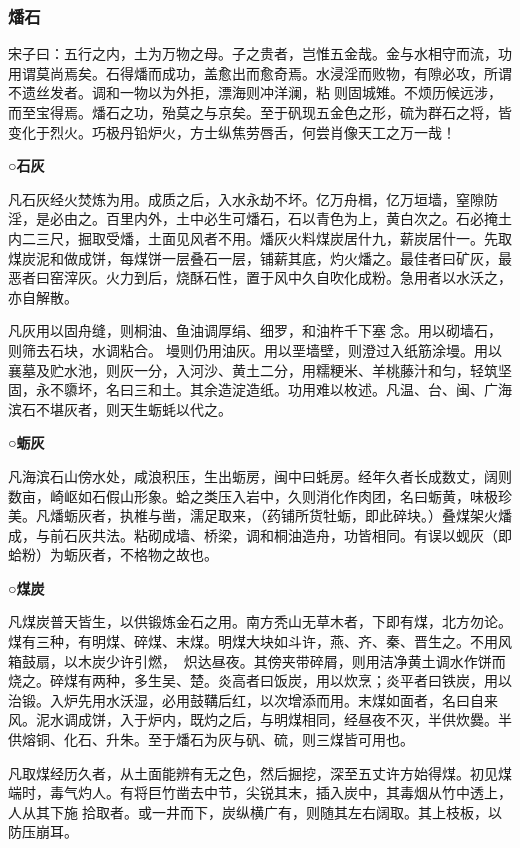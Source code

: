 \documentclass[]{article}
\begin{document}
\hypertarget{header-n2584}{%
\subsubsection{燔石}\label{header-n2584}}

宋子曰：五行之内，土为万物之母。子之贵者，岂惟五金哉。金与水相守而流，功用谓莫尚焉矣。石得燔而成功，盖愈出而愈奇焉。水浸淫而败物，有隙必攻，所谓不遗丝发者。调和一物以为外拒，漂海则冲洋澜，粘则固城雉。不烦历候远涉，而至宝得焉。燔石之功，殆莫之与京矣。至于矾现五金色之形，硫为群石之将，皆变化于烈火。巧极丹铅炉火，方士纵焦劳唇舌，何尝肖像天工之万一哉！

\textbf{○石灰}

凡石灰经火焚炼为用。成质之后，入水永劫不坏。亿万舟楫，亿万垣墙，窒隙防淫，是必由之。百里内外，土中必生可燔石，石以青色为上，黄白次之。石必掩土内二三尺，掘取受燔，土面见风者不用。燔灰火料煤炭居什九，薪炭居什一。先取煤炭泥和做成饼，每煤饼一层叠石一层，铺薪其底，灼火燔之。最佳者曰矿灰，最恶者曰窑滓灰。火力到后，烧酥石性，置于风中久自吹化成粉。急用者以水沃之，亦自解散。

凡灰用以固舟缝，则桐油、鱼油调厚绢、细罗，和油杵千下塞念。用以砌墙石，则筛去石块，水调粘合。墁则仍用油灰。用以垩墙壁，则澄过入纸筋涂墁。用以襄墓及贮水池，则灰一分，入河沙、黄土二分，用糯粳米、羊桃藤汁和匀，轻筑坚固，永不隳坏，名曰三和土。其余造淀造纸。功用难以枚述。凡温、台、闽、广海滨石不堪灰者，则天生蛎蚝以代之。

\textbf{○蛎灰}

凡海滨石山傍水处，咸浪积压，生出蛎房，闽中曰蚝房。经年久者长成数丈，阔则数亩，崎岖如石假山形象。蛤之类压入岩中，久则消化作肉团，名曰蛎黄，味极珍美。凡燔蛎灰者，执椎与凿，濡足取来，（药铺所货牡蛎，即此碎块。）叠煤架火燔成，与前石灰共法。粘砌成墙、桥梁，调和桐油造舟，功皆相同。有误以蚬灰（即蛤粉）为蛎灰者，不格物之故也。

\textbf{○煤炭}

凡煤炭普天皆生，以供锻炼金石之用。南方秃山无草木者，下即有煤，北方勿论。煤有三种，有明煤、碎煤、末煤。明煤大块如斗许，燕、齐、秦、晋生之。不用风箱鼓扇，以木炭少许引燃，炽达昼夜。其傍夹带碎屑，则用洁净黄土调水作饼而烧之。碎煤有两种，多生吴、楚。炎高者曰饭炭，用以炊烹；炎平者曰铁炭，用以治锻。入炉先用水沃湿，必用鼓鞲后红，以次增添而用。末煤如面者，名曰自来风。泥水调成饼，入于炉内，既灼之后，与明煤相同，经昼夜不灭，半供炊爨。半供熔铜、化石、升朱。至于燔石为灰与矾、硫，则三煤皆可用也。

凡取煤经历久者，从土面能辨有无之色，然后掘挖，深至五丈许方始得煤。初见煤端时，毒气灼人。有将巨竹凿去中节，尖锐其末，插入炭中，其毒烟从竹中透上，人从其下施拾取者。或一井而下，炭纵横广有，则随其左右阔取。其上枝板，以防压崩耳。
\end{document}
